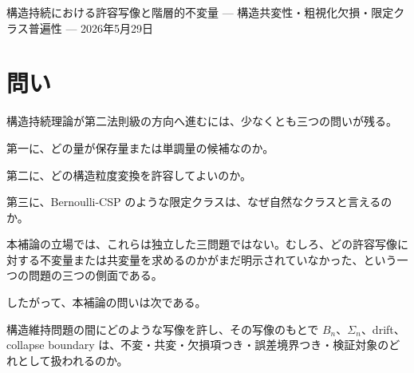 \documentclass[12pt,a4paper]{article}
\begin{document}
\PaperTitleBlock
  {構造持続における許容写像と階層的不変量}
  {— 構造共変性・粗視化欠損・限定クラス普遍性 —}
  {2026年5月29日}

\begin{abstract}
本補論は、構造持続理論における「保存される量」「許容される構造粒度変換」「自然なドメインクラス」の関係を整理する。目的は、構造持続理論を直ちに単一の普遍法則として宣言することではない。むしろ、どの写像のもとで何が不変であり、どの写像のもとで何が共変し、どの写像では欠損項や誤差境界を持ち、どの写像では観測・推定指標による事前登録検証に降りるべきかを明確にすることである。

中心となる見方は、構造維持問題を対象とし、その間の写像を許容写像として扱うことである。名前変更や測度保存同型では累積純損失量 \(B_{n}\) は不変である。測度比を正の冪で読み替えるようなゲージ変更では \(B_{n}\) は正の定数倍として共変する。粗視化や観測指標による推定では一般に不変性は失われるため、許容条件、誤差境界、または凍結後の予測力検証が必要になる。

この整理により、仕様固定構造層、条件付き構造埋め込み層、構造推定層は、強弱の直線的序列ではなく、観測可能性と許容写像の違いとして読める。Bernoulli-CSP class も、SAT 風の構文を後から集めたものではなく、iid bad-event exposure と log-drift を保つテンプレート保存写像で閉じた仕様固定構造層の限定クラスとして位置づけられる。
\end{abstract}

\section{問い}\label{ux554fux3044}

構造持続理論が第二法則級の方向へ進むには、少なくとも三つの問いが残る。

第一に、どの量が保存量または単調量の候補なのか。

第二に、どの構造粒度変換を許容してよいのか。

第三に、Bernoulli-CSP のような限定クラスは、なぜ自然なクラスと言えるのか。

本補論の立場では、これらは独立した三問題ではない。むしろ、どの許容写像に対する不変量または共変量を求めるのかがまだ明示されていなかった、という一つの問題の三つの側面である。

したがって、本補論の問いは次である。

構造維持問題の間にどのような写像を許し、その写像のもとで \(B_{n}\)、\(\Sigma_{n}\)、drift、collapse boundary は、不変・共変・欠損項つき・誤差境界つき・検証対象のどれとして扱われるのか。
\end{document}
